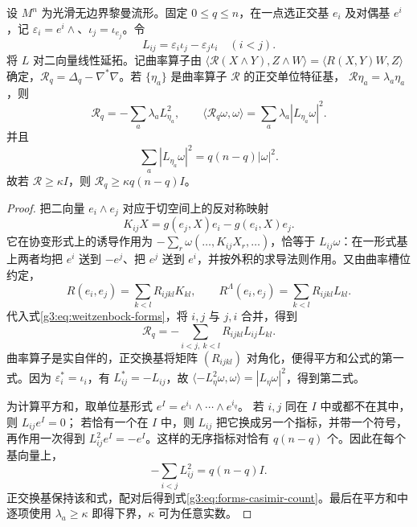 \begin{proposition}\label{g3:prop:curvature-operator-bochner}
	设 \(M^n\) 为光滑无边界黎曼流形。固定 \(0\le q\le n\)，在一点选正交基 \(e_i\) 及对偶基 \(e^i\)，记 \(\varepsilon_i=e^i\wedge\)、\(\iota_j=\iota_{e_j}\)。令
	\[
		L_{ij}=\varepsilon_i\iota_j-\varepsilon_j\iota_i\quad(i<j).
	\]
	将 \(L\) 对二向量线性延拓。记曲率算子由 \(\langle\mathcal R(X\wedge Y),Z\wedge W\rangle=\langle R(X,Y)W,Z\rangle\) 确定，\(\mathcal R_q=\Delta_q-\nabla^*\nabla\)。若
	\(\{\eta_a\}\) 是曲率算子 \(\mathcal R\) 的正交单位特征基，
	\(\mathcal R\eta_a=\lambda_a\eta_a\)，则
	\begin{equation}\label{g3:eq:curvature-operator-bochner-squares}
		\mathcal R_q=-\sum_a\lambda_a L_{\eta_a}^2,\qquad
		\langle\mathcal R_q\omega,\omega\rangle
		   =\sum_a\lambda_a|L_{\eta_a}\omega|^2.
	\end{equation}
	并且
	\begin{equation}\label{g3:eq:forms-casimir-count}
		\sum_a|L_{\eta_a}\omega|^2=q(n-q)|\omega|^2.
	\end{equation}
	故若 \(\mathcal R\ge\kappa I\)，则
	\(\mathcal R_q\ge\kappa q(n-q)I\)。
\end{proposition}
\begin{proof}
	把二向量 \(e_i\wedge e_j\) 对应于切空间上的反对称映射
	\[
		K_{ij}X=g(e_j,X)e_i-g(e_i,X)e_j.
	\]
	它在协变形式上的诱导作用为
	\(-\sum_r\omega(\ldots,K_{ij}X_r,\ldots)\)，恰等于 \(L_{ij}\omega\)：在一形式基上两者均把 \(e^i\) 送到 \(-e^j\)、把 \(e^j\) 送到 \(e^i\)，并按外积的求导法则作用。又由曲率槽位约定，
	\[
		R(e_i,e_j)=\sum_{k<l}R_{ijkl}K_{kl},
		\qquad
		R^\Lambda(e_i,e_j)=\sum_{k<l}R_{ijkl}L_{kl}.
	\]
	代入式\eqref{g3:eq:weitzenbock-forms}，将 \(i,j\) 与 \(j,i\) 合并，得到
	\[
		\mathcal R_q
		=-\sum_{i<j,\ k<l}R_{ijkl}L_{ij}L_{kl}.
	\]
	曲率算子是实自伴的，正交换基将矩阵 \((R_{ijkl})\) 对角化，便得平方和公式的第一式。因为
	\(\varepsilon_i^*=\iota_i\)，有 \(L_{ij}^*=-L_{ij}\)，故
	\(\langle-L_\eta^2\omega,\omega\rangle=|L_\eta\omega|^2\)，得到第二式。

	为计算平方和，取单位基形式
	\(e^I=e^{i_1}\wedge\cdots\wedge e^{i_q}\)。
	若 \(i,j\) 同在 \(I\) 中或都不在其中，则 \(L_{ij}e^I=0\)；
	若恰有一个在 \(I\) 中，则 \(L_{ij}\) 把它换成另一个指标，并带一个符号，再作用一次得到
	\(L_{ij}^2e^I=-e^I\)。这样的无序指标对恰有 \(q(n-q)\) 个。因此在每个基向量上，
	\[
		-\sum_{i<j}L_{ij}^2=q(n-q)I.
	\]
	正交换基保持该和式，配对后得到式\eqref{g3:eq:forms-casimir-count}。最后在平方和中逐项使用
	\(\lambda_a\ge\kappa\) 即得下界，\(\kappa\) 可为任意实数。
\end{proof}

